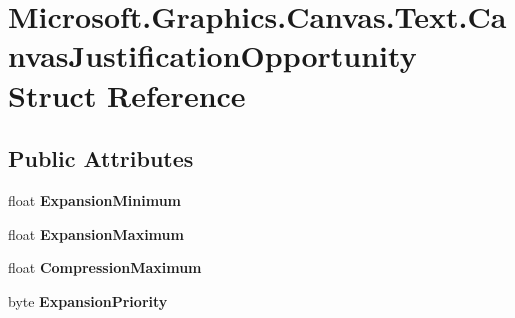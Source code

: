 \hypertarget{struct_microsoft_1_1_graphics_1_1_canvas_1_1_text_1_1_canvas_justification_opportunity}{}\section{Microsoft.\+Graphics.\+Canvas.\+Text.\+Canvas\+Justification\+Opportunity Struct Reference}
\label{struct_microsoft_1_1_graphics_1_1_canvas_1_1_text_1_1_canvas_justification_opportunity}
\subsection*{Public Attributes}
\begin{DoxyCompactItemize}
\item 
\mbox{\label{struct_microsoft_1_1_graphics_1_1_canvas_1_1_text_1_1_canvas_justification_opportunity_a9e8677571215d7bd852baf088b03514a}} 
float {\bfseries Expansion\+Minimum}
\item 
\mbox{\label{struct_microsoft_1_1_graphics_1_1_canvas_1_1_text_1_1_canvas_justification_opportunity_a88bbc5771ab67f1b87a0d42c81548fb4}} 
float {\bfseries Expansion\+Maximum}
\item 
\mbox{\label{struct_microsoft_1_1_graphics_1_1_canvas_1_1_text_1_1_canvas_justification_opportunity_a8b3333e5690c3196daa084838191937f}} 
float {\bfseries Compression\+Maximum}
\item 
\mbox{\label{struct_microsoft_1_1_graphics_1_1_canvas_1_1_text_1_1_canvas_justification_opportunity_ae774be95ddfb8c40e120ddf640304f16}} 
byte {\bfseries Expansion\+Priority}
\item 
\mbox{\label{struct_microsoft_1_1_graphics_1_1_canvas_1_1_text_1_1_canvas_justification_opportunity_a70b458432a9b003cdd6ed90b2280e483}} 

\end{DoxyCompactItemize}

